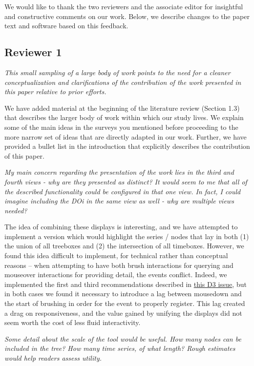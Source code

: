 \documentclass{article}
\begin{document}
We would like to thank the two reviewers and the associate editor for insightful
and constructive comments on our work. Below, we describe changes to the paper
text and software based on this feedback.

\subsection{Reviewer 1}

\textit{This small sampling of a large body of work points to the need for a
  cleaner conceptualization and clarifications of the contribution of the work
  presented in this paper relative to prior efforts.}

We have added material at the beginning of the literature review (Section 1.3) that
describes the larger body of work within which our study lives. We explain some of
the main ideas in the surveys you mentioned before proceeding to the more narrow
set of ideas that are directly adapted in our work. Further, we have provided a
bullet list in the introduction that explicitly describes the contribution of
this paper.

\textit{My main concern regarding the presentation of the work lies in the third
  and fourth views - why are they presented as distinct? It would seem to me
  that all of the described functionality could be configured in that one view.
  In fact, I could imagine including the DOi in the same view as well - why are
  multiple views needed?}

The idea of combining these displays is interesting, and we have attempted to
implement a version which would highlight the series / nodes that lay in both
(1) the union of all treeboxes and (2) the intersection of all timeboxes.
However, we found this idea difficult to implement, for technical rather than
conceptual reasons -- when attempting to have both brush interactions for
querying and mouseover interactions for providing detail, the events conflict.
Indeed, we implemented the first and third recommendations described in
\href{https://github.com/d3/d3/issues/1604}{this D3 issue}, but in both cases we
found it necessary to introduce a lag between mousedown and the start of
brushing in order for the event to properly register. This lag created a drag on
responsiveness, and the value gained by unifying the displays did not seem worth
the cost of less fluid interactivity.

\textit{Some detail about the scale of the tool would be useful. How many nodes
  can be included in the tree? How many time series, of what length? Rough
  estimates would help readers assess utility.}
\end{document}
